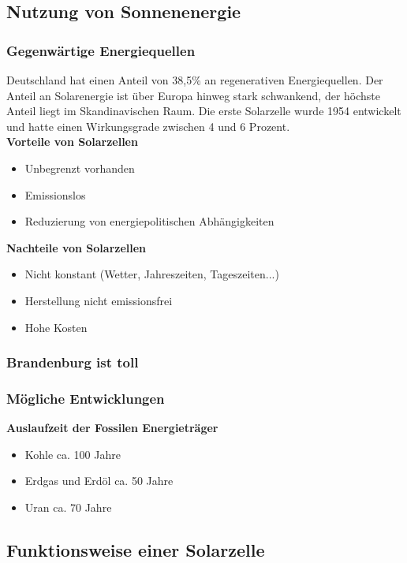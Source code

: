 \subsection{Nutzung von Sonnenenergie}

	\subsubsection{Gegenwärtige Energiequellen}
		Deutschland hat einen Anteil von 38,5\% an regenerativen Energiequellen. Der Anteil an Solarenergie ist über Europa hinweg stark schwankend, der höchste Anteil liegt im Skandinavischen Raum. Die erste Solarzelle wurde 1954 entwickelt und hatte einen Wirkungsgrade zwischen 4 und 6 Prozent.\\
		{\bfseries Vorteile von Solarzellen}\\
		\begin{itemize}
			\item Unbegrenzt vorhanden
			\item Emissionslos
			\item Reduzierung von energiepolitischen Abhängigkeiten
		\end{itemize}
		{\bfseries Nachteile von Solarzellen}\\
		\begin{itemize}
			\item Nicht konstant (Wetter, Jahreszeiten, Tageszeiten...)	
			\item Herstellung nicht emissionsfrei
			\item Hohe Kosten	
		\end{itemize}
	\subsubsection{Brandenburg ist toll}
	\subsubsection{Mögliche Entwicklungen}
		{\bfseries Auslaufzeit der Fossilen Energieträger}
		\begin{itemize}
			\item Kohle ca. 100 Jahre
			\item Erdgas und Erdöl ca. 50 Jahre
			\item Uran ca. 70 Jahre
		\end{itemize}

\subsection{Funktionsweise einer Solarzelle}

